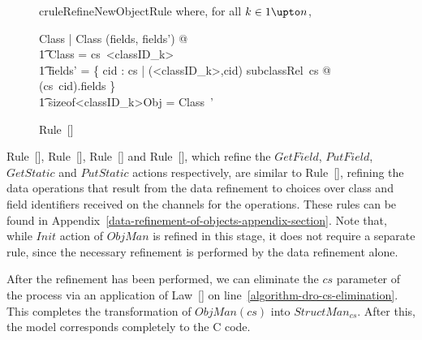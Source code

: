 \begin{figure}[thp]
\begin{restatable}{crule}{RefineNewObjectRule}
    where, for all $k \in 1 \upto n$,
    \begin{circus} 
        \exists \Delta Class | \Xi Class \hide (fields, fields') @ \\
        \t1 \theta Class = cs~{<}classID_k{>} \land \\
        \t1 fields' = \bigcup \{ cid : \dom cs | ({<}classID_k{>},cid) \in subclassRel~cs @ (cs~cid).fields \} \land  \\
        \t1 sizeof{<}classID_k{>}Obj = \theta Class~'\\
    \end{circus}
  \end{restatable}
  \caption{Rule~[]}
  \label{refine-NewObject-rule-figure}
\end{figure}

Rule~[],
Rule~[],
Rule~[] and
Rule~[], which refine the $GetField$,
$PutField$, $GetStatic$ and $PutStatic$ actions respectively, are
similar to Rule~[], refining the data
operations that result from the data refinement to choices over class
and field identifiers received on the channels for the operations.
These rules can be found in
Appendix~\ref{data-refinement-of-objects-appendix-section}.
Note that, while $Init$ action of $ObjMan$ is refined in this stage,
it does not require a separate rule, since the necessary refinement is
performed by the data refinement alone.

After the refinement has been performed, we can eliminate the $cs$
parameter of the process via an application of
Law~[] on
line~\ref{algorithm-dro-cs-elimination}.
This completes the transformation of $ObjMan(cs)$ into
$StructMan_{cs}$.
After this, the model corresponds completely to the C code.
